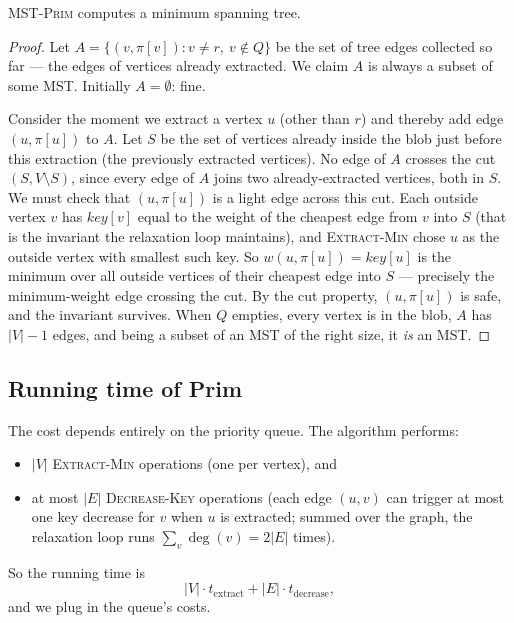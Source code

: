 \begin{theorem}\label{ch23:thm-prim}
\textsc{MST-Prim} computes a minimum spanning tree.
\end{theorem}

\begin{proof}
Let $A = \{(v,\pi[v]) : v \ne r,\ v \notin Q\}$ be the set of tree edges
collected so far --- the edges of vertices already extracted. We claim $A$ is
always a subset of some MST. Initially $A = \emptyset$: fine.

Consider the moment we extract a vertex $u$ (other than $r$) and thereby add edge
$(u, \pi[u])$ to $A$. Let $S$ be the set of vertices already inside the blob just
before this extraction (the previously extracted vertices). No edge of $A$ crosses
the cut $(S, V\setminus S)$, since every edge of $A$ joins two already-extracted
vertices, both in $S$. We must check that $(u,\pi[u])$ is a light edge across this
cut. Each outside vertex $v$ has $key[v]$ equal to the weight of the cheapest edge
from $v$ into $S$ (that is the invariant the relaxation loop maintains), and
\textsc{Extract-Min} chose $u$ as the outside vertex with smallest such key. So
$w(u,\pi[u]) = key[u]$ is the minimum over all outside vertices of their cheapest
edge into $S$ --- precisely the minimum-weight edge crossing the cut. By the cut
property, $(u,\pi[u])$ is safe, and the invariant survives. When $Q$ empties,
every vertex is in the blob, $A$ has $|V|-1$ edges, and being a subset of an MST
of the right size, it \emph{is} an MST.
\end{proof}

\subsection{Running time of Prim}

The cost depends entirely on the priority queue. The algorithm performs:

\begin{itemize}
\item $|V|$ \textsc{Extract-Min} operations (one per vertex), and
\item at most $|E|$ \textsc{Decrease-Key} operations (each edge $(u,v)$ can
  trigger at most one key decrease for $v$ when $u$ is extracted; summed over the
  graph, the relaxation loop runs $\sum_v \deg(v) = 2|E|$ times).
\end{itemize}

So the running time is
\[ |V|\cdot t_{\text{extract}} + |E|\cdot t_{\text{decrease}}, \]
and we plug in the queue's costs.

